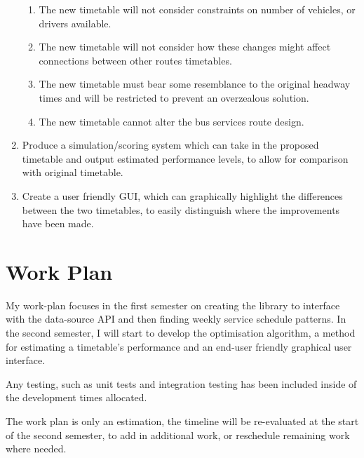 \documentclass[]{report}
\begin{document}
\begin{enumerate}
\begin{enumerate}
		\item The new timetable will not consider constraints on number of vehicles, or drivers available. 
		\item The new timetable will not consider how these changes might affect connections between other routes timetables.
		\item The new timetable must bear some resemblance to the original headway times and will be restricted to prevent an overzealous solution.  
		\item The new timetable cannot alter the bus services route design.
	\end{enumerate}
	\item Produce a simulation/scoring system which can take in the proposed timetable and output estimated performance levels, to allow for comparison with original timetable.
	\item Create a user friendly GUI, which can graphically highlight the differences between the two timetables, to easily distinguish where the improvements have been made.  

\end{enumerate}



\section*{Work Plan}
My work-plan focuses in the first semester on creating the library to interface with the data-source API and then finding weekly service schedule patterns. In the second semester, I will start to develop the optimisation algorithm, a method for estimating a timetable's performance and an end-user friendly graphical user interface. 

\vspace{0.5cm}
Any testing, such as unit tests and integration testing has been included inside of the development times allocated. 

\vspace{0.5cm}
The work plan is only an estimation, the timeline will be re-evaluated at the start of the second semester, to add in additional work, or reschedule remaining work where needed.  
\end{document}
